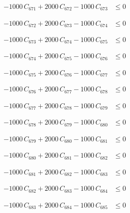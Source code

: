 \documentclass[a4paper,11pt]{article}
\begin{document}
\begin{align}
-1000\,C_{671} + 2000\,C_{672} - 1000\,C_{673} &\leq 0 \nonumber
\end{align}

\begin{align}
-1000\,C_{672} + 2000\,C_{673} - 1000\,C_{674} &\leq 0 \nonumber
\end{align}

\begin{align}
-1000\,C_{673} + 2000\,C_{674} - 1000\,C_{675} &\leq 0 \nonumber
\end{align}

\begin{align}
-1000\,C_{674} + 2000\,C_{675} - 1000\,C_{676} &\leq 0 \nonumber
\end{align}

\begin{align}
-1000\,C_{675} + 2000\,C_{676} - 1000\,C_{677} &\leq 0 \nonumber
\end{align}

\begin{align}
-1000\,C_{676} + 2000\,C_{677} - 1000\,C_{678} &\leq 0 \nonumber
\end{align}

\begin{align}
-1000\,C_{677} + 2000\,C_{678} - 1000\,C_{679} &\leq 0 \nonumber
\end{align}

\begin{align}
-1000\,C_{678} + 2000\,C_{679} - 1000\,C_{680} &\leq 0 \nonumber
\end{align}

\begin{align}
-1000\,C_{679} + 2000\,C_{680} - 1000\,C_{681} &\leq 0 \nonumber
\end{align}

\begin{align}
-1000\,C_{680} + 2000\,C_{681} - 1000\,C_{682} &\leq 0 \nonumber
\end{align}

\begin{align}
-1000\,C_{681} + 2000\,C_{682} - 1000\,C_{683} &\leq 0 \nonumber
\end{align}

\begin{align}
-1000\,C_{682} + 2000\,C_{683} - 1000\,C_{684} &\leq 0 \nonumber
\end{align}

\begin{align}
-1000\,C_{683} + 2000\,C_{684} - 1000\,C_{685} &\leq 0 \nonumber
\end{align}
\end{document}
